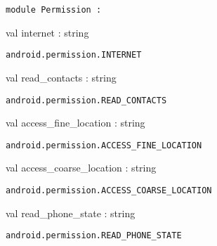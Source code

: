 \documentclass[11pt]{article}
\begin{document}
\begin{ocamldoccode}
{\tt{module }}{\tt{Permission}}{\tt{ : }}\end{ocamldoccode}
\label{module:Android.Permission}

\begin{ocamldocsigend}


\label{val:Android.Permission.internet}\begin{ocamldoccode}
val internet : string
\end{ocamldoccode}
\begin{ocamldocdescription}
{\tt{android.permission.INTERNET}}


\end{ocamldocdescription}


\label{val:Android.Permission.read-underscorecontacts}\begin{ocamldoccode}
val read_contacts : string
\end{ocamldoccode}
\begin{ocamldocdescription}
{\tt{android.permission.READ\_CONTACTS}}


\end{ocamldocdescription}


\label{val:Android.Permission.access-underscorefine-underscorelocation}\begin{ocamldoccode}
val access_fine_location : string
\end{ocamldoccode}
\begin{ocamldocdescription}
{\tt{android.permission.ACCESS\_FINE\_LOCATION}}


\end{ocamldocdescription}


\label{val:Android.Permission.access-underscorecoarse-underscorelocation}\begin{ocamldoccode}
val access_coarse_location : string
\end{ocamldoccode}
\begin{ocamldocdescription}
{\tt{android.permission.ACCESS\_COARSE\_LOCATION}}


\end{ocamldocdescription}


\label{val:Android.Permission.read-underscorephone-underscorestate}\begin{ocamldoccode}
val read_phone_state : string
\end{ocamldoccode}
\begin{ocamldocdescription}
{\tt{android.permission.READ\_PHONE\_STATE}}



\end{ocamldocdescription}
\end{ocamldocsigend}
\end{document}
